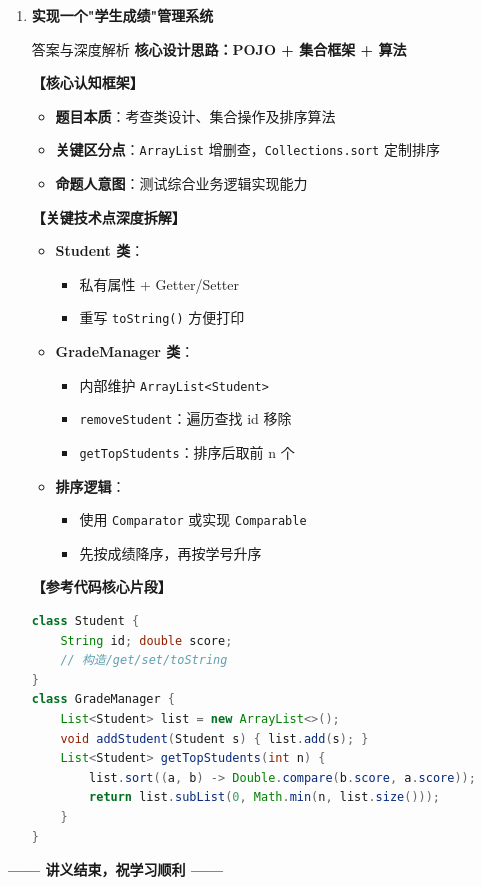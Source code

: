 \documentclass[12pt, a4paper]{ctexart}
\newcommand{\code}[1]{\texttt{#1}}
\begin{document}
\begin{enumerate}[label=\textbf{\arabic*.}, leftmargin=*, itemsep=1.5em]
\item \textbf{实现一个"学生成绩"管理系统}
\begin{bluebox}{答案与深度解析}
\textbf{核心设计思路：POJO + 集合框架 + 算法}

\textbf{【核心认知框架】}
\begin{itemize}[leftmargin=*, nosep]
    \item \textbf{题目本质}：考查类设计、集合操作及排序算法
    \item \textbf{关键区分点}：\code{ArrayList} 增删查，\code{Collections.sort} 定制排序
    \item \textbf{命题人意图}：测试综合业务逻辑实现能力
\end{itemize}

\textbf{【关键技术点深度拆解】}
\begin{itemize}[leftmargin=*, nosep]
    \item \textbf{Student 类}：
    \begin{itemize}
        \item 私有属性 + Getter/Setter
        \item 重写 \code{toString()} 方便打印
    \end{itemize}
    \item \textbf{GradeManager 类}：
    \begin{itemize}
        \item 内部维护 \code{ArrayList<Student>}
        \item \code{removeStudent}：遍历查找 id 移除
        \item \code{getTopStudents}：排序后取前 n 个
    \end{itemize}
    \item \textbf{排序逻辑}：
    \begin{itemize}
        \item 使用 \code{Comparator} 或实现 \code{Comparable}
        \item 先按成绩降序，再按学号升序
    \end{itemize}
\end{itemize}

\textbf{【参考代码核心片段】}
\begin{lstlisting}[language=Java]
class Student {
    String id; double score;
    // 构造/get/set/toString
}
class GradeManager {
    List<Student> list = new ArrayList<>();
    void addStudent(Student s) { list.add(s); }
    List<Student> getTopStudents(int n) {
        list.sort((a, b) -> Double.compare(b.score, a.score));
        return list.subList(0, Math.min(n, list.size()));
    }
}
\end{lstlisting}
\end{bluebox}
\end{enumerate}

\vfill
\begin{center}
\bfseries —— 讲义结束，祝学习顺利 ——
\end{center}
\end{document}
